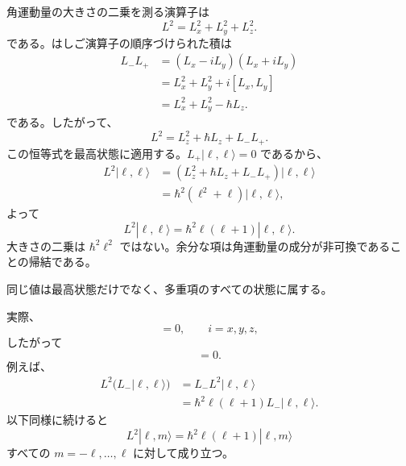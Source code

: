 角運動量の大きさの二乗を測る演算子は
\begin{equation}
L^2=L_x^2+L_y^2+L_z^2.
\end{equation}
である。はしご演算子の順序づけられた積は
\begin{align}
L_-L_+
&=(L_x-iL_y)(L_x+iL_y) \\
&=L_x^2+L_y^2+i[L_x,L_y] \\
&=L_x^2+L_y^2-\hbar L_z.
\end{align}
である。したがって、
\begin{equation}
L^2=L_z^2+\hbar L_z+L_-L_+.
\end{equation}
この恒等式を最高状態に適用する。\(L_+|\ell,\ell\rangle=0\) であるから、
\begin{align}
L^2|\ell,\ell\rangle
&=\left(L_z^2+\hbar L_z+L_-L_+\right)|\ell,\ell\rangle \\
&=\hbar^2\left(\ell^2+\ell\right)|\ell,\ell\rangle,
\end{align}
よって
\begin{equation}
L^2|\ell,\ell\rangle
=\hbar^2\ell(\ell+1)|\ell,\ell\rangle.
\end{equation}
大きさの二乗は \(\hbar^2\ell^2\) ではない。余分な項は角運動量の成分が非可換であることの帰結である。

同じ値は最高状態だけでなく、多重項のすべての状態に属する。

\begin{classroomqa}
\end{classroomqa}

実際、
\begin{equation}
[L^2,L_i]=0,
\qquad i=x,y,z,
\end{equation}
したがって
\begin{equation}
[L^2,L_\pm]=0.
\end{equation}
例えば、
\begin{align}
L^2\bigl(L_-|\ell,\ell\rangle\bigr)
&=L_-L^2|\ell,\ell\rangle \\
&=\hbar^2\ell(\ell+1)L_-|\ell,\ell\rangle.
\end{align}
以下同様に続けると
\begin{equation}
L^2|\ell,m\rangle
=\hbar^2\ell(\ell+1)|\ell,m\rangle
\end{equation}
すべての \(m=-\ell,\ldots,\ell\) に対して成り立つ。


